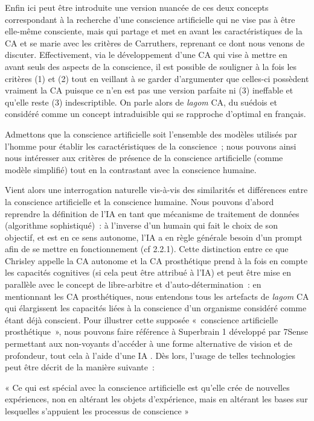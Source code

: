 \documentclass[a4paper, titlepage, 12pt]{article}
\newenvironment{longquote}%
{\vspace{-9pt}\begin{center}\begin{minipage}{120mm}\singlespacing\footnotesize «}%
{»\end{minipage}\end{center}\vspace{9pt}}
\begin{document}
	Enfin ici peut être introduite une version nuancée de ces deux concepts correspondant à la recherche d’une conscience artificielle qui ne vise pas à être elle-même consciente, mais qui partage et met en avant les caractéristiques de la CA et se marie avec les critères de Carruthers, reprenant ce dont nous venons de discuter. Effectivement, via le développement d’une CA qui vise à mettre en avant seuls des aspects de la conscience, il est possible de souligner à la fois les critères (1) et (2) tout en veillant à se garder d’argumenter que celles-ci possèdent vraiment la CA puisque ce n’en est pas une version parfaite ni (3) ineffable et qu’elle reste (3) indescriptible. On parle alors de \textit{lagom} CA, du suédois et considéré comme un concept intraduisible qui se rapproche d'optimal en français.

	Admettons que la conscience artificielle soit l’ensemble des modèles utilisés par l’homme pour établir les caractéristiques de la conscience~; nous pouvons ainsi nous intéresser aux critères de présence de la conscience artificielle (comme modèle simplifié) tout en la contrastant avec la conscience humaine.

	Vient alors une interrogation naturelle vis-à-vis des similarités et différences entre la conscience artificielle et la conscience humaine.  Nous pouvons d’abord reprendre la définition de l’IA en tant que mécanisme de traitement de données  (algorithme sophistiqué)~: à l’inverse d’un humain qui fait le choix de son objectif, et est en ce sens autonome, l’IA a en règle générale besoin d’un prompt afin de se mettre en fonctionnement (cf 2.2.1). Cette distinction entre ce que Chrisley appelle la CA autonome et la CA prosthétique prend à la fois en compte les capacités cognitives (si cela peut être attribué à l’IA) et peut être mise en parallèle avec le concept de libre-arbitre et d’auto-détermination~: en mentionnant les CA prosthétiques, nous entendons tous les artefacts de \textit{lagom} CA qui élargissent les capacités liées à la conscience d’un organisme considéré comme étant déjà conscient. Pour illustrer cette supposée «~conscience artificielle prosthétique~», nous pouvons faire référence à Superbrain 1 développé par 7Sense permettant aux non-voyants d'accéder à une forme alternative de vision et de profondeur, tout cela à l’aide d’une IA \cite{SuperBrain17Sense}. Dès lors, l’usage de telles technologies peut être décrit de la manière suivante~: \cite{manzottiArtificialConsciousnessDiscipline2008}
	\begin{longquote}
		Ce qui est spécial avec la conscience artificielle est qu’elle crée de nouvelles expériences, non en altérant les objets d'expérience, mais en altérant les bases sur lesquelles s’appuient les processus de conscience
	\end{longquote}
	
\end{document}
